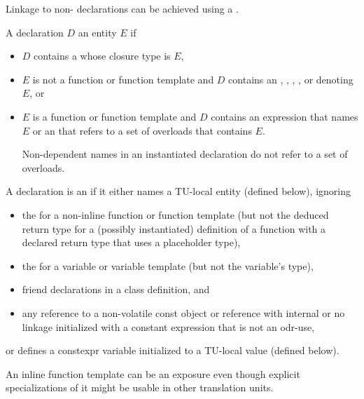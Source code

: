 \pnum
\begin{note}
Linkage to non-\Cpp{} declarations can be achieved using a
.
\end{note}

\pnum
A declaration $D$  an entity $E$ if
\begin{itemize}
\item
$D$ contains a  whose closure type is $E$,
\item
$E$ is not a function or function template and $D$ contains an
,
,
,
, or
denoting $E$, or
\item
$E$ is a function or function template and
$D$ contains an expression that names $E$ or
an 
that refers to a set of overloads that contains $E$.
\begin{note}
Non-dependent names in an instantiated declaration
do not refer to a set of overloads.
\end{note}
\end{itemize}

\pnum
A declaration is an 
if it either names a TU-local entity (defined below), ignoring
\begin{itemize}
\item
the 
for a non-inline function or function template
(but not the deduced return type
for a (possibly instantiated) definition of a function
with a declared return type that uses a placeholder type),
\item
the 
for a variable or variable template (but not the variable's type),
\item
friend declarations in a class definition, and
\item
any reference to a non-volatile const object or reference
with internal or no linkage initialized with a constant expression
that is not an odr-use,
\end{itemize}
or defines a constexpr variable initialized to a TU-local value (defined below).
\begin{note}
An inline function template can be an exposure even though
explicit specializations of it might be usable in other translation units.
\end{note}

